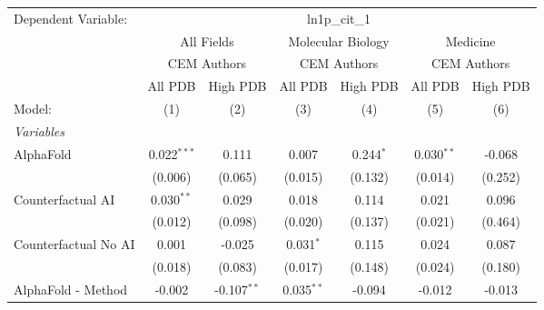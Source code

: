 \begingroup
\centering
\begin{tabular}{lcccccc}
   \tabularnewline \midrule \midrule
   Dependent Variable: & \multicolumn{6}{c}{ln1p\_cit\_1}\\
 & \multicolumn{2}{c}{All Fields} & \multicolumn{2}{c}{Molecular Biology} & \multicolumn{2}{c}{Medicine} \\
\cmidrule(lr){2-3} \cmidrule(lr){4-5} \cmidrule(lr){6-7}
 & \multicolumn{2}{c}{CEM Authors} & \multicolumn{2}{c}{CEM Authors} & \multicolumn{2}{c}{CEM Authors} \\
\cmidrule(lr){2-3} \cmidrule(lr){4-5} \cmidrule(lr){6-7}
 & \multicolumn{1}{c}{All PDB} & \multicolumn{1}{c}{High PDB} & \multicolumn{1}{c}{All PDB} & \multicolumn{1}{c}{High PDB} & \multicolumn{1}{c}{All PDB} & \multicolumn{1}{c}{High PDB} \\
\cmidrule(lr){2-2} \cmidrule(lr){3-3} \cmidrule(lr){4-4} \cmidrule(lr){5-5} \cmidrule(lr){6-6} \cmidrule(lr){7-7}
   Model:                                                     & (1)            & (2)           & (3)          & (4)         & (5)            & (6)\\  
   \midrule
   \emph{Variables}\\
   AlphaFold                                                  & 0.022$^{***}$  & 0.111         & 0.007        & 0.244$^{*}$ & 0.030$^{**}$   & -0.068\\   
                                                              & (0.006)        & (0.065)       & (0.015)      & (0.132)     & (0.014)        & (0.252)\\   
   Counterfactual AI                                          & 0.030$^{**}$   & 0.029         & 0.018        & 0.114       & 0.021          & 0.096\\   
                                                              & (0.012)        & (0.098)       & (0.020)      & (0.137)     & (0.021)        & (0.464)\\   
   Counterfactual No AI                                       & 0.001          & -0.025        & 0.031$^{*}$  & 0.115       & 0.024          & 0.087\\   
                                                              & (0.018)        & (0.083)       & (0.017)      & (0.148)     & (0.024)        & (0.180)\\   
   AlphaFold - Method                                         & -0.002         & -0.107$^{**}$ & 0.035$^{**}$ & -0.094      & -0.012         & -0.013\\   

\end{tabular}
